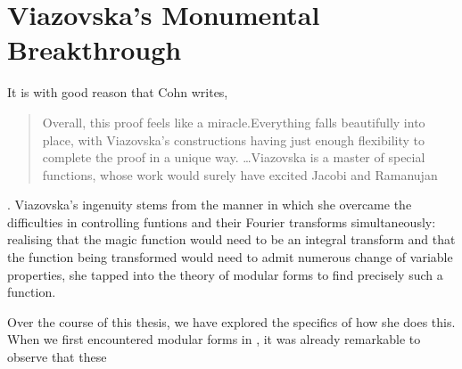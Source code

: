 \section{Viazovska's Monumental Breakthrough}

It is with good reason that Cohn writes,
\begin{quote}
    Overall, this proof feels like a miracle.Everything falls beautifully into place, with Viazovska’s constructions having just enough flexibility to complete the proof in a unique way. \ldots Viazovska is a master of special functions, whose work would surely have excited Jacobi and Ramanujan
\end{quote}
\cite[p.21]{CohnOnViazovskaICM}. Viazovska's ingenuity stems from the manner in which she overcame the difficulties in controlling funtions and their Fourier transforms simultaneously: realising that the magic function would need to be an integral transform and that the function being transformed would need to admit numerous change of variable properties, she tapped into the theory of modular forms to find precisely such a function.

Over the course of this thesis, we have explored the specifics of how she does this. When we first encountered modular forms in , it was already remarkable to observe that these 